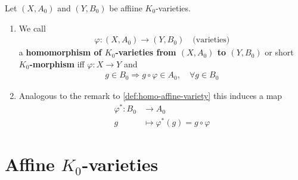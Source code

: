 \documentclass[]{article}
\begin{document}
\begin{definition}
    Let \((X,A_0)\) and \((Y,B_0)\) be affiine \(K_0\)-varieties.
    \begin{enumerate}
        \item We call
        \begin{align*}
            \varphi: (X,A_0) \rightarrow (Y,B_0) \quad \text{(varieties)}
        \end{align*}
        a \textbf{homomorphism of \(K_0\)-varieties from \((X,A_0)\) to \((Y,B_0)\)} or short \textbf{\(K_0\)-morphism} iff
        \(\varphi:X \rightarrow Y\) and
        \begin{align*}
            g \in B_0 \Longrightarrow g \circ \varphi \in A_0, \quad \forall g \in B_0
        \end{align*}
        \item Analogous to the remark to \ref{def:homo-affine-variety} this induces a map
        \begin{align*}
            \varphi^*: B_0 &\rightarrow A_0 \\
                        g &\mapsto \varphi^*(g)=g \circ \varphi
        \end{align*}
    \end{enumerate}

\end{definition}

\setcounter{section}{12}
\section{Affine \(K_0\)-varieties}
\end{document}
